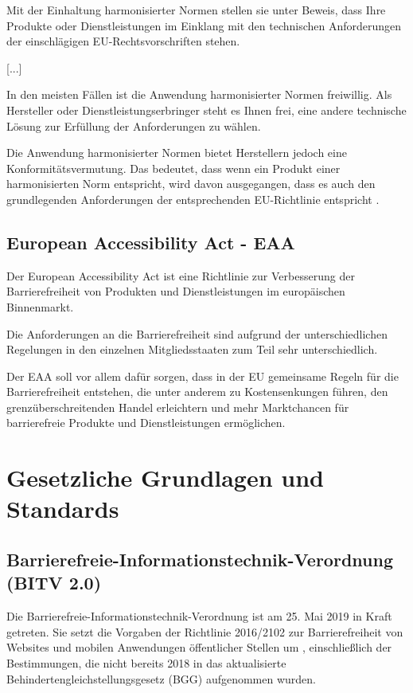 Mit der Einhaltung harmonisierter Normen stellen sie unter Beweis, dass Ihre Produkte oder Dienstleistungen im Einklang mit den technischen Anforderungen der einschlägigen EU-Rechtsvorschriften stehen.

[...]

In den meisten Fällen ist die Anwendung harmonisierter Normen freiwillig. Als Hersteller oder Dienstleistungserbringer steht es Ihnen frei, eine andere technische Lösung zur Erfüllung der Anforderungen zu wählen.
\parencite{eu_normharmonisiert_2025}

Die Anwendung harmonisierter Normen bietet Herstellern jedoch eine Konformitätsvermutung. Das bedeutet, dass wenn ein Produkt einer harmonisierten Norm entspricht, wird davon ausgegangen, dass es auch den grundlegenden Anforderungen der entsprechenden EU-Richtlinie entspricht \parencite[vgl.][]{dke_harmonierte-norm_nodate}.

\subsection{European Accessibility Act - EAA}
Der European Accessibility Act ist eine Richtlinie zur Verbesserung der Barrierefreiheit von Produkten und Dienstleistungen im europäischen Binnenmarkt.

Die Anforderungen an die Barrierefreiheit sind aufgrund der unterschiedlichen Regelungen in den einzelnen Mitgliedsstaaten zum Teil sehr unterschiedlich.

Der EAA soll vor allem dafür sorgen, dass in der EU gemeinsame Regeln für die Barrierefreiheit entstehen, die unter anderem zu Kostensenkungen führen, den grenzüberschreitenden Handel erleichtern und mehr Marktchancen für barrierefreie Produkte und Dienstleistungen ermöglichen. \parencite[vgl.][]{eu_eaa_2025}

\section{Gesetzliche Grundlagen und Standards}
\subsection{Barrierefreie-Informationstechnik-Verordnung (BITV 2.0)}
Die Barrierefreie-Informationstechnik-Verordnung ist am 25. Mai 2019 in Kraft getreten. Sie setzt die Vorgaben der Richtlinie 2016/2102 zur Barrierefreiheit von Websites und mobilen Anwendungen öffentlicher Stellen um \parencite[vgl.][]{bfj_bitv2_2025}, einschließlich der Bestimmungen, die nicht bereits 2018 in das aktualisierte Behindertengleichstellungsgesetz (BGG) aufgenommen wurden. 

